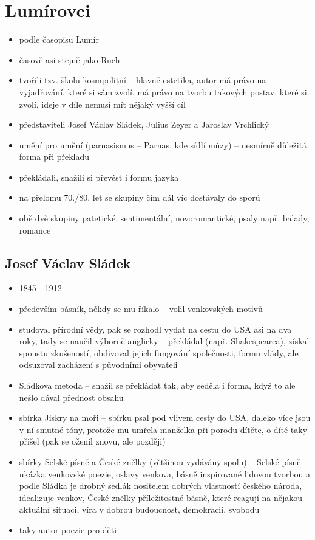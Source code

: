 \documentclass{article}
\begin{document}
\section{Lumírovci}
\begin{itemize}
  \item podle časopisu Lumír
  \item časově asi stejně jako Ruch
  \item tvořili tzv. školu kosmpolitní -- hlavně estetika, autor má právo na vyjadřování, které si sám zvolí, má právo na tvorbu takových postav, které si zvolí, ideje v díle nemusí mít nějaký vyšší cíl
  \item představiteli Josef Václav Sládek, Julius Zeyer a Jaroslav Vrchlický
  \item umění pro umění (parnasismus -- Parnas, kde sídlí múzy) -- nesmírně důležitá forma při překladu
  \item překládali, snažili si převést i formu jazyka
  \item na přelomu 70./80. let se skupiny čím dál víc dostávaly do sporů
  \item obě dvě skupiny patetické, sentimentální, novoromantické, psaly např. balady, romance
\end{itemize}

\subsection{Josef Václav Sládek}
\begin{itemize}
  \item 1845 - 1912
  \item především básník, někdy se mu říkalo  -- volil venkovských motivů
  \item studoval přírodní vědy, pak se rozhodl vydat na cestu do USA asi na dva roky, tady se naučil výborně anglicky -- překládal (např. Shakespearea), získal spoustu zkušeností, obdivoval jejich fungování společnosti, formu vlády, ale odsuzoval zacházení s původními obyvateli
  \item Sládkova metoda -- snažil se překládat tak, aby seděla i forma, když to ale nešlo dával přednost obsahu
  \item sbírka Jiskry na moři -- sbírku psal pod vlivem cesty do USA, daleko více jsou v ní smutné tóny, protože mu umřela manželka při porodu dítěte, o dítě taky přišel (pak se oženil znovu, ale později)
  \item sbírky Selské písně a České znělky (většinou vydávány spolu) -- Selské písně ukázka venkovské poezie, oslavy venkova, básně inspirované lidovou tvorbou a podle Sládka je drobný sedlák nositelem dobrých vlastností českého národa, idealizuje venkov, České znělky příležitostné básně, které reagují na nějakou aktuální situaci, víra v dobrou budoucnost, demokracii, svobodu
  \item taky autor poezie pro děti
\end{itemize}
\end{document}
